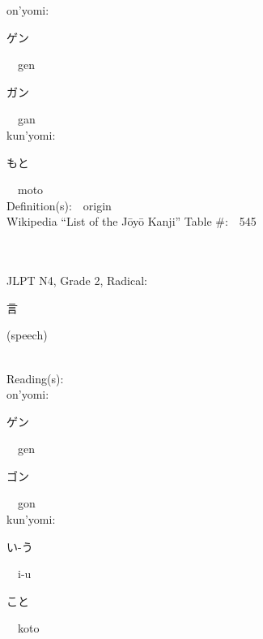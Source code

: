 \begin{multicols}{2}
{\hspace*{1em}}on'yomi:\ \ \\
{\hspace*{2em}}{\begin{CJK}{UTF8}{min} ゲン \end{CJK}}\ \ gen\ \ \\
{\hspace*{2em}}{\begin{CJK}{UTF8}{min} ガン \end{CJK}}\ \ gan\ \ \\
{\hspace*{1em}}kun'yomi:\ \ \\
{\hspace*{2em}}{\begin{CJK}{UTF8}{min} もと \end{CJK}}\ \ moto\ \ \\
Definition(s):\ \ origin \\
Wikipedia ``List of the J\=oy\=o Kanji'' Table \#:\ \ 545 \\
\ \ \\
{\fontsize{34pt}{40pt}  }\ \ \\  %
{JLPT N4, Grade 2, Radical:\ \ {\begin{CJK}{UTF8}{min} 言 \end{CJK}} (speech) } \\
Reading(s):\ \ \\
{\hspace*{1em}}on'yomi:\ \ \\
{\hspace*{2em}}{\begin{CJK}{UTF8}{min} ゲン \end{CJK}}\ \ gen\ \ \\
{\hspace*{2em}}{\begin{CJK}{UTF8}{min} ゴン \end{CJK}}\ \ gon\ \ \\
{\hspace*{1em}}kun'yomi:\ \ \\
{\hspace*{2em}}{\begin{CJK}{UTF8}{min} い-う \end{CJK}}\ \ i-u\ \ \\
{\hspace*{2em}}{\begin{CJK}{UTF8}{min} こと \end{CJK}}\ \ koto\ \ \\

\end{multicols}
